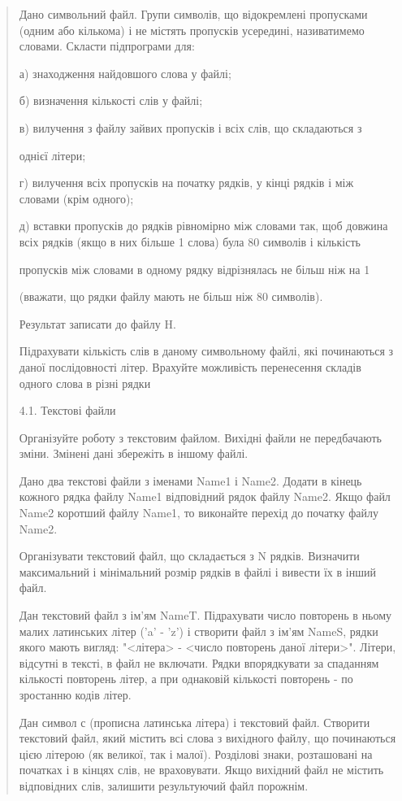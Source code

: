 \documentclass[]{article}
\begin{document}
\begin{quote}
Дано символьний файл. Групи символів, що відокремлені пропусками (одним
або кількома) і не містять пропусків усередині, називатимемо словами.
Скласти підпрограми для:

а) знаходження найдовшого слова у файлі;

б) визначення кількості слів у файлі;

в) вилучення з файлу зайвих пропусків і всіх слів, що складаються з

однієї літери;

г) вилучення всіх пропусків на початку рядків, у кінці рядків і між
словами (крім одного);

д) вставки пропусків до рядків рівномірно між словами так, щоб довжина
всіх рядків (якщо в них більше 1 слова) була 80 символів і кількість

пропусків між словами в одному рядку відрізнялась не більш ніж на 1

(вважати, що рядки файлу мають не більш ніж 80 символів).

Результат записати до файлу H.

Підрахувати кількість слів в даному символьному файлі, які починаються з
даної послідовності літер. Врахуйте можливість перенесення складів
одного слова в різні рядки

4.1. Текстові файли

\protect\hypertarget{_Hlk65238588}{}{}Організуйте роботу з текстовим
файлом. Вихідні файли не передбачають зміни. Змінені дані збережіть в
іншому файлі.

Дано два текстові файли з іменами Name1 і Name2. Додати в кінець кожного
рядка файлу Name1 відповідний рядок файлу Name2. Якщо файл Name2
коротший файлу Name1, то виконайте перехід до початку файлу Name2.

Організувати текстовий файл, що складається з N рядків. Визначити
максимальний і мінімальний розмір рядків в файлі і вивести їх в інший
файл.

Дан текстовий файл з ім'ям NameT. Підрахувати число повторень в ньому
малих латинських літер ('a' - 'z') і створити файл з ім'ям NameS, рядки
якого мають вигляд: "\textless{}літера\textgreater{} - \textless{}число
повторень даної літери\textgreater{}". Літери, відсутні в тексті, в файл
не включати. Рядки впорядкувати за спаданням кількості повторень літер,
а при однаковій кількості повторень - по зростанню кодів літер.

Дан символ с (прописна латинська літера) і текстовий файл. Створити
текстовий файл, який містить всі слова з вихідного файлу, що починаються
цією літерою (як великої, так і малої). Розділові знаки, розташовані на
початках і в кінцях слів, не враховувати. Якщо вихідний файл не містить
відповідних слів, залишити результуючий файл порожнім.


\end{quote}
\end{document}
